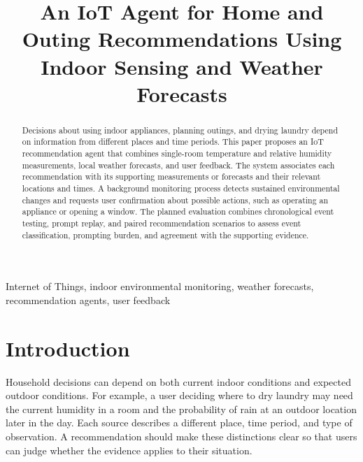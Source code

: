 \documentclass[conference]{IEEEtran}
\begin{document}
\title{An IoT Agent for Home and Outing Recommendations Using Indoor Sensing and Weather Forecasts}

\author{
}

\maketitle

\begin{abstract}
Decisions about using indoor appliances, planning outings, and drying laundry depend on information from different places and time periods. This paper proposes an IoT recommendation agent that combines single-room temperature and relative humidity measurements, local weather forecasts, and user feedback. The system associates each recommendation with its supporting measurements or forecasts and their relevant locations and times. A background monitoring process detects sustained environmental changes and requests user confirmation about possible actions, such as operating an appliance or opening a window. The planned evaluation combines chronological event testing, prompt replay, and paired recommendation scenarios to assess event classification, prompting burden, and agreement with the supporting evidence.
\end{abstract}

\begin{IEEEkeywords}
Internet of Things, indoor environmental monitoring, weather forecasts, recommendation agents, user feedback
\end{IEEEkeywords}

\section{Introduction}
Household decisions can depend on both current indoor conditions and expected outdoor conditions. For example, a user deciding where to dry laundry may need the current humidity in a room and the probability of rain at an outdoor location later in the day. Each source describes a different place, time period, and type of observation. A recommendation should make these distinctions clear so that users can judge whether the evidence applies to their situation.
\end{document}

